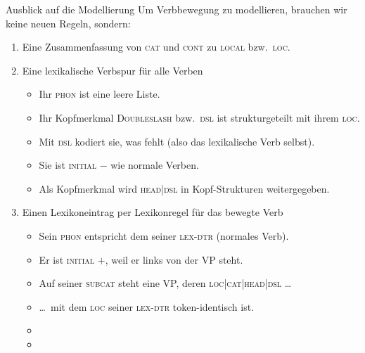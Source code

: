 \begin{frame}
  {Ausblick auf die Modellierung}
  \onslide<+->
  Um \alert{Verbbewegung} zu modellieren, brauchen wir keine neuen Regeln, sondern:\\
  \Halbzeile
  \begin{enumerate}[<+->]
    \item Eine Zusammenfassung von \textsc{cat} und \textsc{cont} zu \alert{\textsc{local}} bzw.\ \alert{\textsc{loc}}.
    \Viertelzeile
    \item Eine \alert{lexikalische Verbspur} für alle Verben
      \begin{itemize}[<+->]
        \item Ihr \textsc{phon} ist eine leere Liste.
        \item Ihr Kopfmerkmal \textsc{Doubleslash} bzw.\ \alert{\textsc{dsl} ist strukturgeteilt mit ihrem \textsc{loc}}.
        \item Mit \textsc{dsl} kodiert sie, was fehlt (also das lexikalische Verb selbst).
        \item Sie ist \textsc{initial $-$} wie normale Verben.
        \item Als Kopfmerkmal wird \textsc{head|dsl} in Kopf-Strukturen weitergegeben.
      \end{itemize}
      \Viertelzeile
    \item Einen Lexikoneintrag per \alert{Lexikonregel für das bewegte Verb}
      \begin{itemize}[<+->]
        \item Sein \textsc{phon} entspricht dem seiner \textsc{lex-dtr} (normales Verb).
        \item Er ist \textsc{initial $+$}, weil er links von der VP steht.
        \item Auf seiner \textsc{subcat} steht eine VP, deren \textsc{loc|cat|head|dsl} \ldots
        \item \ldots\ mit dem \textsc{loc} seiner \textsc{lex-dtr} token-identisch ist.
        \item {}
        \item {}
      \end{itemize}
  \end{enumerate}
\end{frame}

